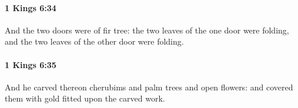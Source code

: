 		\paragraph{1 Kings 6:34} %
			\label{1KINGS-6-34}

			And the two doors were of fir tree: the two leaves of the one door were folding, and the two leaves of the other door were folding.


		\paragraph{1 Kings 6:35} %
			\label{1KINGS-6-35}

			And he carved thereon cherubims and palm trees and open flowers: and covered them with gold fitted upon the carved work.


